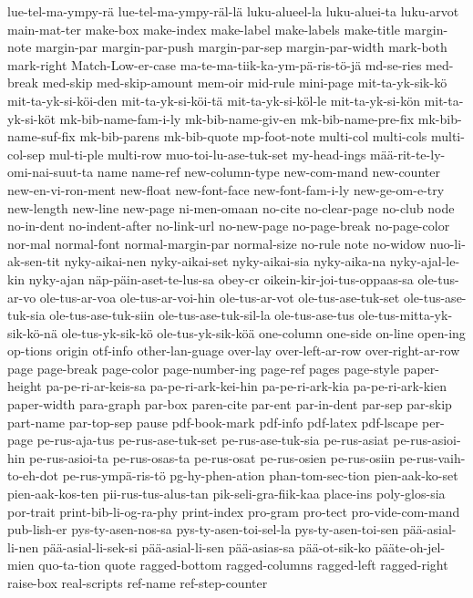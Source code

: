 {lue-tel-ma-ympy-rä
lue-tel-ma-ympy-räl-lä
luku-alueel-la
luku-aluei-ta
luku-arvot
main-mat-ter
make-box
make-index
make-label
make-labels
make-title
margin-note
margin-par
margin-par-push
margin-par-sep
margin-par-width
mark-both
mark-right
Match-Low-er-case
ma-te-ma-tiik-ka-ym-pä-ris-tö-jä
md-se-ries
med-break
med-skip
med-skip-amount
mem-oir
mid-rule
mini-page
mit-ta-yk-sik-kö
mit-ta-yk-si-köi-den
mit-ta-yk-si-köi-tä
mit-ta-yk-si-köl-le
mit-ta-yk-si-kön
mit-ta-yk-si-köt
mk-bib-name-fam-i-ly
mk-bib-name-giv-en
mk-bib-name-pre-fix
mk-bib-name-suf-fix
mk-bib-parens
mk-bib-quote
mp-foot-note
multi-col
multi-cols
multi-col-sep
mul-ti-ple
multi-row
muo-toi-lu-ase-tuk-set
my-head-ings
mää-rit-te-ly-omi-nai-suut-ta
name
name-ref
new-column-type
new-com-mand
new-counter
new-en-vi-ron-ment
new-float
new-font-face
new-font-fam-i-ly
new-ge-om-e-try
new-length
new-line
new-page
ni-men-omaan
no-cite
no-clear-page
no-club
node
no-in-dent
no-indent-after
no-link-url
no-new-page
no-page-break
no-page-color
nor-mal
normal-font
normal-margin-par
normal-size
no-rule
note
no-widow
nuo-li-ak-sen-tit
nyky-aikai-nen
nyky-aikai-set
nyky-aikai-sia
nyky-aika-na
nyky-ajal-le-kin
nyky-ajan
näp-päin-aset-te-lus-sa
obey-cr
oikein-kir-joi-tus-oppaas-sa
ole-tus-ar-vo
ole-tus-ar-voa
ole-tus-ar-voi-hin
ole-tus-ar-vot
ole-tus-ase-tuk-set
ole-tus-ase-tuk-sia
ole-tus-ase-tuk-siin
ole-tus-ase-tuk-sil-la
ole-tus-ase-tus
ole-tus-mitta-yk-sik-kö-nä
ole-tus-yk-sik-kö
ole-tus-yk-sik-köä
one-column
one-side
on-line
open-ing
op-tions
origin
otf-info
other-lan-guage
over-lay
over-left-ar-row
over-right-ar-row
page
page-break
page-color
page-number-ing
page-ref
pages
page-style
paper-height
pa-pe-ri-ar-keis-sa
pa-pe-ri-ark-kei-hin
pa-pe-ri-ark-kia
pa-pe-ri-ark-kien
paper-width
para-graph
par-box
paren-cite
par-ent
par-in-dent
par-sep
par-skip
part-name
par-top-sep
pause
pdf-book-mark
pdf-info
pdf-latex
pdf-lscape
per-page
pe-rus-aja-tus
pe-rus-ase-tuk-set
pe-rus-ase-tuk-sia
pe-rus-asiat
pe-rus-asioi-hin
pe-rus-asioi-ta
pe-rus-osas-ta
pe-rus-osat
pe-rus-osien
pe-rus-osiin
pe-rus-vaih-to-eh-dot
pe-rus-ympä-ris-tö
pg-hy-phen-ation
phan-tom-sec-tion
pien-aak-ko-set
pien-aak-kos-ten
pii-rus-tus-alus-tan
pik-seli-gra-fiik-kaa
place-ins
poly-glos-sia
por-trait
print-bib-li-og-ra-phy
print-index
pro-gram
pro-tect
pro-vide-com-mand
pub-lish-er
pys-ty-asen-nos-sa
pys-ty-asen-toi-sel-la
pys-ty-asen-toi-sen
pää-asial-li-nen
pää-asial-li-sek-si
pää-asial-li-sen
pää-asias-sa
pää-ot-sik-ko
pääte-oh-jel-mien
quo-ta-tion
quote
ragged-bottom
ragged-columns
ragged-left
ragged-right
raise-box
real-scripts
ref-name
ref-step-counter
}
